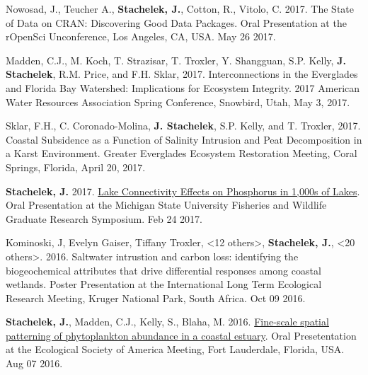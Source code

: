 \documentclass[11pt]{article}
\makeatletter
\newlength{\bibhang}
\newlength{\bibsep}
 {\@listi \global\bibsep\itemsep \global\advance\bibsep by\parsep}
\newenvironment{bibenum*}
  {\renewcommand\labelenumi{[\theenumi]}%
   \etaremune[
     topsep=0pt,
     itemsep=\bibsep,
     parsep=0pt,partopsep=0pt,
     itemindent=-\bibhang,
     leftmargin={\bibhang+\widthof{[999]}}]}
  {\endetaremune}
\makeatother
\begin{document}
\begin{bibenum*}
  \item Nowosad, J., Teucher A., \textbf{Stachelek, J.}, Cotton, R., Vitolo, C. 2017. The State of Data on CRAN: Discovering Good Data Packages. Oral Presentation at the rOpenSci Unconference, Los Angeles, CA, USA. May 26 2017.

  \item Madden, C.J., M. Koch, T. Strazisar, T. Troxler, Y. Shangguan, S.P. Kelly, \textbf{J. Stachelek}, R.M. Price, and F.H. Sklar, 2017. Interconnections in the Everglades and Florida Bay Watershed: Implications for Ecosystem Integrity. 2017 American Water Resources Association Spring Conference, Snowbird, Utah, May 3, 2017.

  \item Sklar, F.H., C. Coronado-Molina, \textbf{J. Stachelek}, S.P. Kelly, and T. Troxler, 2017. Coastal Subsidence as a Function of Salinity Intrusion and Peat Decomposition in a Karst Environment. Greater Everglades Ecosystem Restoration Meeting, Coral Springs, Florida, April 20, 2017.

  \item \textbf{Stachelek, J.} 2017. \href{https://doi.org/10.6084/m9.figshare.8187038.v1}{Lake Connectivity Effects on Phosphorus in 1,000s of Lakes}. Oral Presentation at the Michigan State University Fisheries and Wildlife Graduate Research Symposium. Feb 24 2017.

  \item Kominoski, J, Evelyn Gaiser, Tiffany Troxler, <12 others>, \textbf{Stachelek, J.}, <20 others>. 2016. Saltwater intrustion and carbon loss: identifying the biogeochemical attributes that drive differential responses among coastal wetlands. Poster Presentation at the International Long Term Ecological Research Meeting, Kruger National Park, South Africa. Oct 09 2016.

  \item \textbf{Stachelek, J.}, Madden, C.J., Kelly, S., Blaha, M. 2016. \href{http://doi.org/10.6084/m9.figshare.2775322.v4}{Fine-scale spatial patterning of phytoplankton abundance in a coastal estuary}. Oral Presetentation at the Ecological Society of America Meeting, Fort Lauderdale, Florida, USA. Aug 07 2016. 
  

\end{bibenum*}
\end{document}
